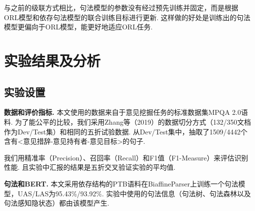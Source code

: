 与之前的级联方式相比，句法模型的参数没有经过预先训练并固定，而是根据ORL模型和依存句法模型的联合训练目标进行更新. 这样做的好处是训练出的句法模型更偏向于ORL模型，能更好地适应ORL任务.


\section{实验结果及分析}
\subsection{实验设置}
\textbf{数据和评价指标. } 本文使用的数据来自于意见挖掘任务的标准数据集MPQA 2.0语料. 为了能公平的比较，我们采用Zhang等（2019）的数据切分方式（132/350文档作为Dev/Test集）和相同的五折试验数据. 从Dev/Test集中，抽取了1509/4442个含有<意见措辞-意见持有者-意见目标>的句子.

我们用精准率（Precision）、召回率（Recall）和F1值（F1-Measure）来评估识别性能. 且实验中汇报的结果是五折交叉验证实验的平均值.

\textbf{句法和BERT. }
本文采用依存结构的PTB语料在BiaffineParser上训练一个句法模型，UAS/LAS为95.43\%/93.92\%. 实验中使用的句法信息（句法树、句法森林以及句法感知隐状态）都由该模型产生.

